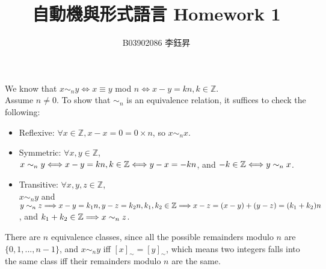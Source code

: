 \documentclass{article}
\title{自動機與形式語言 Homework 1}
\author{B03902086 李鈺昇}
\date{}
\begin{document}
    \maketitle
    
    \renewcommand{\baselinestretch}{1.5}
    
    \section{}
        We know that $x \sim_n y \Longleftrightarrow x \equiv y$ mod $n \Longleftrightarrow x - y = kn, k \in \mathbb{Z}$. \\
        Assume $n \neq 0$. To show that $\sim_n$ is an equivalence relation,
        it suffices to check the following:
        \begin{itemize}
            \item Reflexive: $\forall x \in \mathbb{Z}, x - x = 0 = 0 \times n$, so $x \sim_n x$.
            \item Symmetric: $\forall x, y \in \mathbb{Z}$, \\
                $x \sim_n y \\
                \Longleftrightarrow x - y = kn, k \in \mathbb{Z} \\
                \Longleftrightarrow y - x = -kn$, and $-k \in \mathbb{Z} \\
                \Longleftrightarrow y \sim_n x$.
            \item Transitive: $\forall x, y, z \in \mathbb{Z}$, \\
                $x \sim_n y$ and $y \sim_n z \\
                \Longrightarrow x - y = k_1n, y - z = k_2n, k_1, k_2 \in \mathbb{Z} \\
                \Longrightarrow x - z = (x - y) + (y - z) = (k_1 + k_2)n$, and $k_1 + k_2 \in \mathbb{Z} \\
                \Longrightarrow x \sim_n z$.
        \end{itemize}
        There are $n$ equivalence classes,
        since all the possible remainders modulo $n$ are $\{0, 1, ..., n-1\}$,
        and $x \sim_n y$ iff $[x]_\sim = [y]_\sim$,
        which means two integers falls into the same class iff their remainders modulo $n$ are the same.
    
\end{document}
